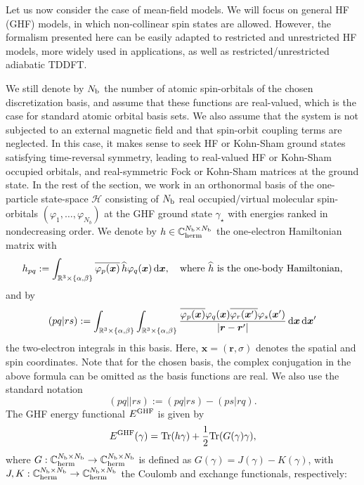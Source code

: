 \documentclass[11pt]{article}
\def\R{{\mathbb R}}
\def\C{{\mathbb C}}
\begin{document}
Let us now consider the case of mean-field models. We will  focus on general HF (GHF) models, in which non-collinear spin states are allowed. However, the formalism presented here can be easily adapted to restricted and unrestricted HF models, more widely used in applications, as well as restricted/unrestricted adiabatic TDDFT.

\medskip

We still denote by $N_{\rm b}$ the number of atomic spin-orbitals of the chosen discretization basis, and assume that these functions are real-valued, which is the case for standard atomic orbital basis sets. We also assume that the system is not subjected to an external magnetic field and that spin-orbit coupling terms are neglected. In this case, it makes sense to seek HF or Kohn-Sham ground states satisfying time-reversal symmetry, leading to real-valued HF or Kohn-Sham occupied orbitals, and real-symmetric Fock or Kohn-Sham matrices at the ground state. In the rest of the section, we work in an orthonormal basis of the one-particle state-space $\mathcal H$ consisting of $N_{\rm b}$ real occupied/virtual molecular spin-orbitals $(\varphi_1,\ldots,\varphi_{N_b})$ at the GHF ground state $\gamma_\star$ with energies ranked in nondecreasing order. We denote by $h \in \C^{N_{\rm b} \times N_{\rm b}}_{\rm herm}$ the one-electron Hamiltonian matrix with
$$h_{pq}:=\int_{\R^3 \times \{ \alpha,\beta\}} \overline{\varphi_p(\boldsymbol{x})} \, \widehat h\varphi_q(\boldsymbol{x})\,{\rm d}\boldsymbol{x},\quad\text{where}~\widehat h~\text{is the one-body Hamiltonian,}$$
and by 
\begin{align*}
(pq|rs):= \int_{\R^3 \times \{ \alpha,\beta\}} \int_{\R^3 \times \{ \alpha,\beta\}} \frac{ \overline{\varphi_p(\boldsymbol x)}\varphi_q(\boldsymbol x) \overline{\varphi_r(\boldsymbol x')}\varphi_s(\boldsymbol x')}{|\boldsymbol{r}-\boldsymbol{r}'|}\,{\rm d}\boldsymbol{x}\,{\rm d}\boldsymbol{x}'
\end{align*}
the two-electron integrals in this basis. Here, $\boldsymbol{x}=(\boldsymbol{r}, \sigma)$ denotes the spatial and spin coordinates. Note that for the chosen basis, the complex conjugation in the above formula can be omitted as the basis functions are real. We also use the standard notation
$$
(pq||rs):= (pq|rs) - (ps|rq).
$$
The GHF energy functional $E^{\rm GHF}$ is given by
$$
E^{\rm GHF}(\gamma)={\rm Tr}(h\gamma)+\dfrac12{\rm Tr}(G(\gamma)\gamma),
$$
where $G:\C_{\rm herm}^{N_{\rm b}\times N_{\rm b}}\to\C_{\rm herm}^{N_{\rm b}\times N_{\rm b}}$ is defined as $G(\gamma)=J(\gamma)-K(\gamma)$, with $J,K:\C_{\rm herm}^{N_{\rm b}\times N_{\rm b}}\to\C_{\rm herm}^{N_{\rm b}\times N_{\rm b}}$ the Coulomb and exchange functionals, respectively:
\end{document}
